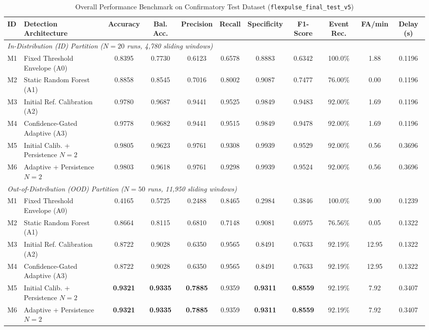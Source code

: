 \documentclass[conference]{IEEEtran}
\begin{document}
\begin{table}[!t]
\caption{Overall Performance Benchmark on Confirmatory Test Dataset (\texttt{flexpulse\_final\_test\_v5})}
\label{tab:overall_perf}
\centering
\begingroup
\footnotesize
\setlength{\tabcolsep}{3.8pt}
\begin{tabular*}{\textwidth}{@{\extracolsep{\fill}}llccccccccc@{}}
\toprule
\textbf{ID} & \textbf{Detection Architecture} & \textbf{Accuracy} & \textbf{Bal. Acc.} & \textbf{Precision} & \textbf{Recall} & \textbf{Specificity} & \textbf{F1-Score} & \textbf{Event Rec.} & \textbf{FA/min} & \textbf{Delay (s)} \\
\midrule
\multicolumn{11}{l}{\textit{In-Distribution (ID) Partition ($N=20$ runs, 4,780 sliding windows)}} \\
\midrule
M1 & Fixed Threshold Envelope (A0) & 0.8395 & 0.7730 & 0.6123 & 0.6578 & 0.8883 & 0.6342 & 100.0\% & 1.88 & 0.1196 \\
M2 & Static Random Forest (A1) & 0.8858 & 0.8545 & 0.7016 & 0.8002 & 0.9087 & 0.7477 & 76.00\% & 0.00 & 0.1196 \\
M3 & Initial Ref. Calibration (A2) & 0.9780 & 0.9687 & 0.9441 & 0.9525 & 0.9849 & 0.9483 & 92.00\% & 1.69 & 0.1196 \\
M4 & Confidence-Gated Adaptive (A3) & 0.9778 & 0.9682 & 0.9441 & 0.9515 & 0.9849 & 0.9478 & 92.00\% & 1.69 & 0.1196 \\
M5 & Initial Calib. + Persistence $N=2$ & 0.9805 & 0.9623 & 0.9761 & 0.9308 & 0.9939 & 0.9529 & 92.00\% & 0.56 & 0.3696 \\
M6 & Adaptive + Persistence $N=2$ & 0.9803 & 0.9618 & 0.9761 & 0.9298 & 0.9939 & 0.9524 & 92.00\% & 0.56 & 0.3696 \\
\midrule
\multicolumn{11}{l}{\textit{Out-of-Distribution (OOD) Partition ($N=50$ runs, 11,950 sliding windows)}} \\
\midrule
M1 & Fixed Threshold Envelope (A0) & 0.4165 & 0.5725 & 0.2488 & 0.8465 & 0.2984 & 0.3846 & 100.0\% & 9.00 & 0.1239 \\
M2 & Static Random Forest (A1) & 0.8664 & 0.8115 & 0.6810 & 0.7148 & 0.9081 & 0.6975 & 76.56\% & 0.05 & 0.1322 \\
M3 & Initial Ref. Calibration (A2) & 0.8722 & 0.9028 & 0.6350 & 0.9565 & 0.8491 & 0.7633 & 92.19\% & 12.95 & 0.1322 \\
M4 & Confidence-Gated Adaptive (A3) & 0.8722 & 0.9028 & 0.6350 & 0.9565 & 0.8491 & 0.7633 & 92.19\% & 12.95 & 0.1322 \\
M5 & Initial Calib. + Persistence $N=2$ & \textbf{0.9321} & \textbf{0.9335} & \textbf{0.7885} & 0.9359 & \textbf{0.9311} & \textbf{0.8559} & 92.19\% & 7.92 & 0.3407 \\
M6 & Adaptive + Persistence $N=2$ & \textbf{0.9321} & \textbf{0.9335} & \textbf{0.7885} & 0.9359 & \textbf{0.9311} & \textbf{0.8559} & 92.19\% & 7.92 & 0.3407 \\
\bottomrule
\end{tabular*}
\endgroup
\end{table}
\end{document}
